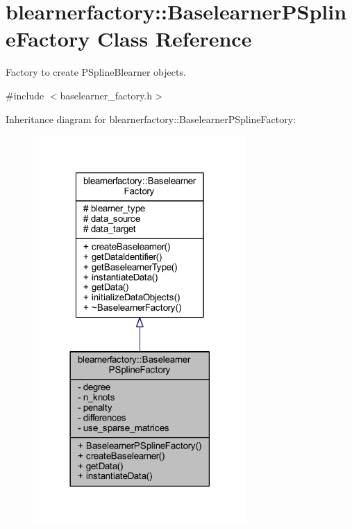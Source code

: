 \hypertarget{classblearnerfactory_1_1_baselearner_p_spline_factory}{}\section{blearnerfactory\+:\+:Baselearner\+P\+Spline\+Factory Class Reference}
\label{classblearnerfactory_1_1_baselearner_p_spline_factory}


Factory to create {\ttfamily P\+Spline\+Blearner} objects.  




{\ttfamily \#include $<$baselearner\+\_\+factory.\+h$>$}



Inheritance diagram for blearnerfactory\+:\+:Baselearner\+P\+Spline\+Factory\+:\nopagebreak
\begin{figure}[H]
\begin{center}
\leavevmode
\includegraphics[width=230pt]{classblearnerfactory_1_1_baselearner_p_spline_factory__inherit__graph}
\end{center}
\end{figure}


